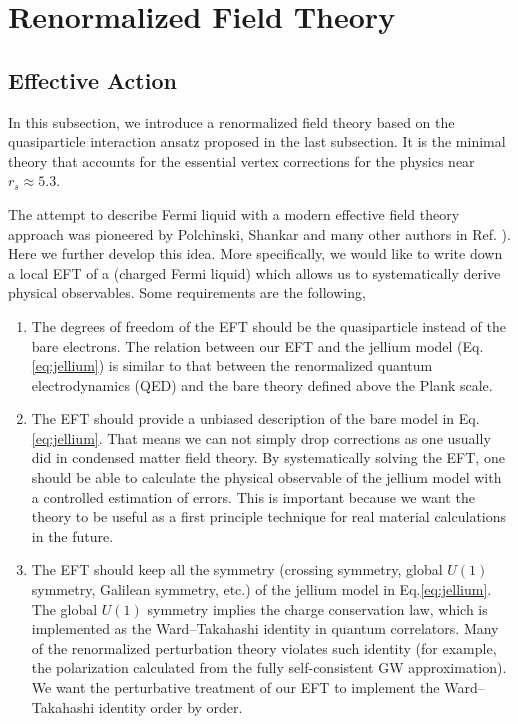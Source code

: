 \documentclass[reprint,amsmath,amssymb,aps,prb]{revtex4-1}
\begin{document}
\section{Renormalized Field Theory}
\subsection{Effective Action}

In this subsection, we introduce a renormalized field theory based on the quasiparticle interaction ansatz proposed in the last subsection. It is the minimal theory that accounts for the essential vertex corrections for the physics near $r_s\approx 5.3$.

The attempt to describe Fermi liquid with a modern effective field theory approach was pioneered by Polchinski, Shankar and many other authors in Ref. \cite{polchinski1992effective, shankarRG, hewsonRG, dupuisRG,ChitovRG}). Here we further develop this idea. More specifically, we would like to write down a local EFT of a (charged Fermi liquid) which allows us to systematically derive physical observables. Some requirements are the following,

\begin{enumerate}
    \item The degrees of freedom of the EFT should be the quasiparticle instead of the bare electrons. The relation between our EFT and the jellium model (Eq.\eqref{eq:jellium}) is similar to that between the renormalized quantum electrodynamics (QED) and the bare theory defined above the Plank scale.

    \item The EFT should provide a unbiased description of the bare model in Eq.\eqref{eq:jellium}. That means we can not simply drop corrections as one usually did in condensed matter field theory. By systematically solving the EFT, one should be able to calculate the physical observable of the jellium model with a controlled estimation of errors. This is important because we want the theory to be useful as a first principle technique for real material calculations in the future.

    \item The EFT should keep all the symmetry (crossing symmetry, global $U(1)$ symmetry, Galilean symmetry, etc.) of the jellium model in Eq.\eqref{eq:jellium}. The global $U(1)$ symmetry implies the charge conservation law, which is implemented as the Ward–Takahashi identity in quantum correlators. Many of the renormalized perturbation theory violates such identity (for example, the polarization calculated from the fully self-consistent GW approximation). We want the perturbative treatment of our EFT to implement the Ward–Takahashi identity order by order.
\end{enumerate}
\end{document}

